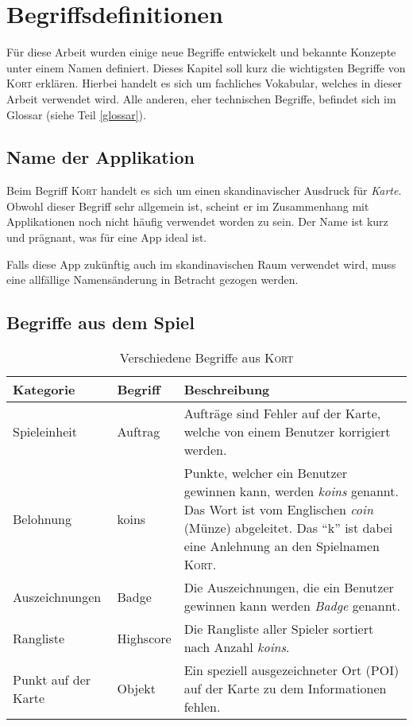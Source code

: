 \chapter{Begriffsdefinitionen}
\label{kort-definitionen}

Für diese Arbeit wurden einige neue Begriffe entwickelt und bekannte Konzepte unter einem Namen definiert.
Dieses Kapitel soll kurz die wichtigsten Begriffe von \textsc{Kort} erklären.
Hierbei handelt es sich um fachliches Vokabular, welches in dieser Arbeit verwendet wird.
Alle anderen, eher technischen Begriffe, befindet sich im Glossar (siehe Teil \ref{glossar}).

\section{Name der Applikation}
Beim Begriff \textsc{Kort} handelt es sich um einen skandinavischer Ausdruck für \emph{Karte}.
Obwohl dieser Begriff sehr allgemein ist, scheint er im Zusammenhang mit Applikationen noch nicht häufig verwendet worden zu sein.
Der Name ist kurz und prägnant, was für eine App ideal ist.

Falls diese App zukünftig auch im skandinavischen Raum verwendet wird, muss eine allfällige Namensänderung in Betracht gezogen werden.

\section{Begriffe aus dem Spiel}

\begin{table}[H]
\centering
\begin{tabular}{|p{0.2\threecelltabwidth}|p{0.12\threecelltabwidth}|p{0.68\threecelltabwidth}|}
\hline 
\small{\textbf{Kategorie}} & \small{\textbf{Begriff}} & \small{\textbf{Beschreibung}} \\
\hline 
Spieleinheit & Auftrag & Aufträge sind Fehler auf der Karte, welche von einem Benutzer korrigiert werden. \\
\hline 
Belohnung & koins & Punkte, welcher ein Benutzer gewinnen kann, werden \emph{koins} genannt.
Das Wort ist vom Englischen \emph{coin} (Münze) abgeleitet. 
Das "`k"' ist dabei eine Anlehnung an den Spielnamen \textsc{Kort}. \\
\hline 
Auszeichnungen & Badge & Die Auszeichnungen, die ein Benutzer gewinnen kann werden \emph{Badge} genannt. \\
\hline 
Rangliste & Highscore & Die Rangliste aller Spieler sortiert nach Anzahl \emph{koins}. \\
\hline 
Punkt auf der Karte & Objekt & Ein speziell ausgezeichneter Ort (\gls{POI}) auf der Karte zu dem Informationen fehlen. \\
\hline 
\end{tabular}
\caption{Verschiedene Begriffe aus \textsc{Kort}}
\label{table-definitionen}
\end{table}